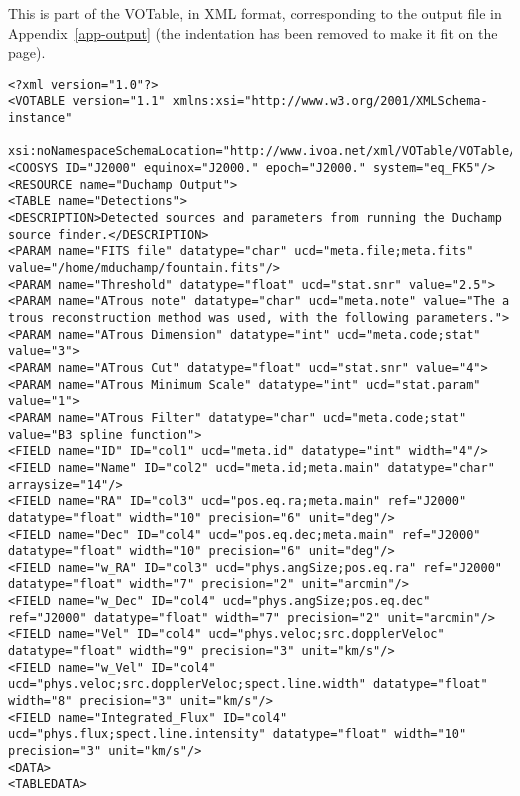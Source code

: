 \begin{landscape}
\label{app-votable}
This is part of the VOTable, in XML format, corresponding to the
output file in Appendix~\ref{app-output} (the indentation has been
removed to make it fit on the page).

{\tiny
  \begin{verbatim}
<?xml version="1.0"?>
<VOTABLE version="1.1" xmlns:xsi="http://www.w3.org/2001/XMLSchema-instance"
 xsi:noNamespaceSchemaLocation="http://www.ivoa.net/xml/VOTable/VOTable/v1.1">
<COOSYS ID="J2000" equinox="J2000." epoch="J2000." system="eq_FK5"/>
<RESOURCE name="Duchamp Output">
<TABLE name="Detections">
<DESCRIPTION>Detected sources and parameters from running the Duchamp source finder.</DESCRIPTION>
<PARAM name="FITS file" datatype="char" ucd="meta.file;meta.fits" value="/home/mduchamp/fountain.fits"/>
<PARAM name="Threshold" datatype="float" ucd="stat.snr" value="2.5">
<PARAM name="ATrous note" datatype="char" ucd="meta.note" value="The a trous reconstruction method was used, with the following parameters.">
<PARAM name="ATrous Dimension" datatype="int" ucd="meta.code;stat" value="3">
<PARAM name="ATrous Cut" datatype="float" ucd="stat.snr" value="4">
<PARAM name="ATrous Minimum Scale" datatype="int" ucd="stat.param" value="1">
<PARAM name="ATrous Filter" datatype="char" ucd="meta.code;stat" value="B3 spline function">
<FIELD name="ID" ID="col1" ucd="meta.id" datatype="int" width="4"/>
<FIELD name="Name" ID="col2" ucd="meta.id;meta.main" datatype="char" arraysize="14"/>
<FIELD name="RA" ID="col3" ucd="pos.eq.ra;meta.main" ref="J2000" datatype="float" width="10" precision="6" unit="deg"/>
<FIELD name="Dec" ID="col4" ucd="pos.eq.dec;meta.main" ref="J2000" datatype="float" width="10" precision="6" unit="deg"/>
<FIELD name="w_RA" ID="col3" ucd="phys.angSize;pos.eq.ra" ref="J2000" datatype="float" width="7" precision="2" unit="arcmin"/>
<FIELD name="w_Dec" ID="col4" ucd="phys.angSize;pos.eq.dec" ref="J2000" datatype="float" width="7" precision="2" unit="arcmin"/>
<FIELD name="Vel" ID="col4" ucd="phys.veloc;src.dopplerVeloc" datatype="float" width="9" precision="3" unit="km/s"/>
<FIELD name="w_Vel" ID="col4" ucd="phys.veloc;src.dopplerVeloc;spect.line.width" datatype="float" width="8" precision="3" unit="km/s"/>
<FIELD name="Integrated_Flux" ID="col4" ucd="phys.flux;spect.line.intensity" datatype="float" width="10" precision="3" unit="km/s"/>
<DATA>
<TABLEDATA>

\end{verbatim}}
\end{landscape}
